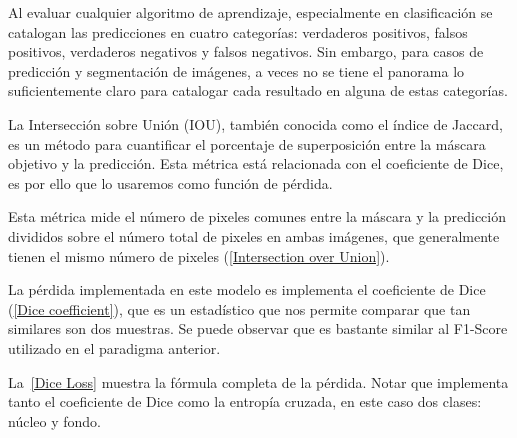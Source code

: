 Al evaluar cualquier algoritmo de aprendizaje, especialmente en clasificación se
catalogan las predicciones en cuatro categorías: verdaderos positivos, falsos
positivos, verdaderos negativos y falsos negativos. Sin embargo, para casos de
predicción y segmentación de imágenes, a veces no se tiene el panorama lo
suficientemente claro para catalogar cada resultado en alguna de estas
categorías.

La Intersección sobre Unión (IOU), también conocida como el índice de Jaccard, es
un método para cuantificar el porcentaje de superposición entre la máscara
objetivo y la predicción. Esta métrica está relacionada con el coeficiente de Dice,
es por ello que lo usaremos como función de pérdida. 

Esta métrica mide el número de pixeles comunes entre la máscara y la predicción divididos
sobre el número total de pixeles en ambas imágenes, que generalmente tienen el 
mismo número de pixeles (\autoref{Intersection over Union}). 



La pérdida implementada en este modelo es implementa el coeficiente de Dice
(\autoref{Dice coefficient}), que es un estadístico que nos permite comparar que tan
similares son dos muestras. Se puede observar que es bastante similar al F1-Score
utilizado en el paradigma anterior.



La~\autoref{Dice Loss} muestra la fórmula completa de la pérdida. Notar
que implementa tanto el coeficiente de Dice como la entropía cruzada, en este caso
dos clases: núcleo y fondo.


